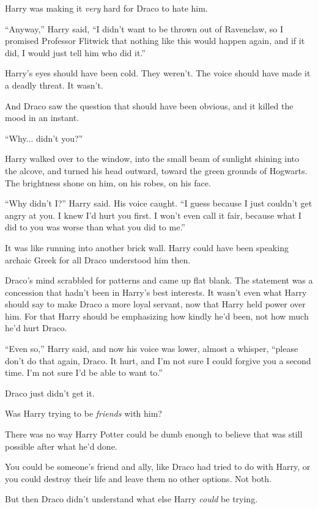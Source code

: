 Harry was making it \emph{very} hard for Draco to hate him.

``Anyway,'' Harry said, ``I didn't want to be thrown out of Ravenclaw, so I promised Professor Flitwick that nothing like this would happen again, and if it did, I would just tell him who did it.''

Harry's eyes should have been cold. They weren't. The voice should have made it a deadly threat. It wasn't.

And Draco saw the question that should have been obvious, and it killed the mood in an instant.

``Why... didn't you?''

Harry walked over to the window, into the small beam of sunlight shining into the alcove, and turned his head outward, toward the green grounds of Hogwarts. The brightness shone on him, on his robes, on his face.

``Why didn't I?'' Harry said. His voice caught. ``I guess because I just couldn't get angry at you. I knew I'd hurt you first. I won't even call it fair, because what I did to you was worse than what you did to me.''

It was like running into another brick wall. Harry could have been speaking archaic Greek for all Draco understood him then.

Draco's mind scrabbled for patterns and came up flat blank. The statement was a concession that hadn't been in Harry's best interests. It wasn't even what Harry should say to make Draco a more loyal servant, now that Harry held power over him. For that Harry should be emphasizing how kindly he'd been, not how much he'd hurt Draco.

``Even so,'' Harry said, and now his voice was lower, almost a whisper, ``please don't do that again, Draco. It hurt, and I'm not sure I could forgive you a second time. I'm not sure I'd be able to want to.''

Draco just didn't get it.

Was Harry trying to be \emph{friends} with him?

There was no way Harry Potter could be dumb enough to believe that was still possible after what he'd done.

You could be someone's friend and ally, like Draco had tried to do with Harry, or you could destroy their life and leave them no other options. Not both.

But then Draco didn't understand what else Harry \emph{could} be trying.

